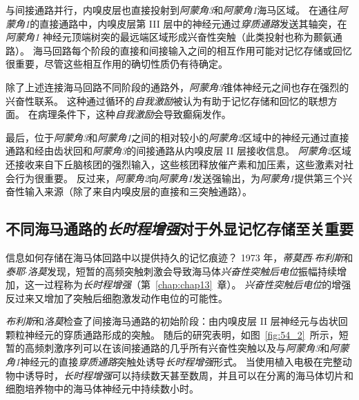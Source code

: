 与间接通路并行，内嗅皮层也直接投射到\textit{阿蒙角3}和\textit{阿蒙角1}海马区域。
在通往\textit{阿蒙角1}的直接通路中，内嗅皮层第 III 层中的神经元通过\textit{穿质通路}发送其轴突，在\textit{阿蒙角1} 神经元顶端树突的最远端区域形成兴奋性突触（此类投射也称为颞氨通路）。
海马回路每个阶段的直接和间接输入之间的相互作用可能对记忆存储或回忆很重要，尽管这些相互作用的确切性质仍有待确定。


除了上述连接海马回路不同阶段的通路外，\textit{阿蒙角3}锥体神经元之间也存在强烈的兴奋性联系。
这种通过循环的\textit{自我激励}被认为有助于记忆存储和回忆的联想方面。
在病理条件下，这种\textit{自我激励}会导致癫痫发作。


最后，位于\textit{阿蒙角3}和\textit{阿蒙角1}之间的相对较小的\textit{阿蒙角2}区域中的神经元通过直接通路和经由齿状回和\textit{阿蒙角3}的间接通路从内嗅皮层 II 层接收信息。
\textit{阿蒙角2}区域还接收来自下丘脑核团的强烈输入，这些核团释放催产素和加压素，这些激素对社会行为很重要。
反过来，\textit{阿蒙角2}向\textit{阿蒙角1}发送强输出，为\textit{阿蒙角1}提供第三个兴奋性输入来源（除了来自内嗅皮层的直接和三突触通路）。



\subsection{不同海马通路的\textit{长时程增强}对于外显记忆存储至关重要}

信息如何存储在海马体回路中以提供持久的记忆痕迹？
1973 年，\textit{蒂莫西$\cdot$布利斯}和\textit{泰耶$\cdot$洛莫}发现，短暂的高频突触刺激会导致海马体\textit{兴奋性突触后电位}振幅持续增加，这一过程称为\textit{长时程增强}（第~\ref{chap:chap13}~章）。
\textit{兴奋性突触后电位}的增强反过来又增加了突触后细胞激发动作电位的可能性。


\textit{布利斯}和\textit{洛莫}检查了间接海马通路的初始阶段：由内嗅皮层 II 层神经元与齿状回颗粒神经元的穿质通路形成的突触。
随后的研究表明，如图~\ref{fig:54_2}~所示，短暂的高频刺激序列可以在该间接通路的几乎所有兴奋性突触以及与\textit{阿蒙角3}和\textit{阿蒙角1}神经元的直接\textit{穿质通路}突触处诱导\textit{长时程增强}形式。
当使用植入电极在完整动物中诱导时，\textit{长时程增强}可以持续数天甚至数周，并且可以在分离的海马体切片和细胞培养物中的海马体神经元中持续数小时。


